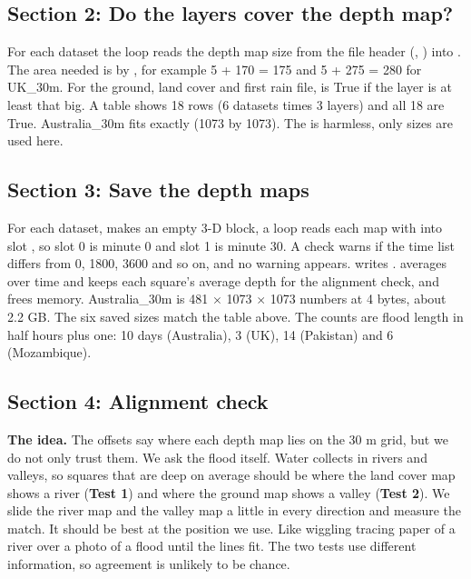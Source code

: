 
\subsection{Section 2: Do the layers cover the depth map?}

For each dataset the loop reads the depth map size from the file header (, ) into . The area needed is  by , for example 5 + 170 = 175 and 5 + 275 = 280 for UK\_30m. For the ground, land cover and first rain file,  is True if the layer is at least that big. A  table shows 18 rows (6 datasets times 3 layers) and all 18 are True. Australia\_30m fits exactly (1073 by 1073). The  is harmless, only sizes are used here.

\subsection{Section 3: Save the depth maps}

For each dataset,  makes an empty 3-D block, a loop reads each map with  into slot , so slot 0 is minute 0 and slot 1 is minute 30. A check warns if the time list differs from 0, 1800, 3600 and so on, and no warning appears.  writes .  averages over time and keeps each square's average depth for the alignment check, and  frees memory. Australia\_30m is 481 $\times$ 1073 $\times$ 1073 numbers at 4 bytes, about 2.2 GB. The six saved sizes match the table above. The counts are flood length in half hours plus one: 10 days (Australia), 3 (UK), 14 (Pakistan) and 6 (Mozambique).

\subsection{Section 4: Alignment check}

\begin{plainbox}
\textbf{The idea.} The offsets say where each depth map lies on the 30 m grid, but we do not only trust them. We ask the flood itself. Water collects in rivers and valleys, so squares that are deep on average should be where the land cover map shows a river (\textbf{Test 1}) and where the ground map shows a valley (\textbf{Test 2}). We slide the river map and the valley map a little in every direction and measure the match. It should be best at the position we use. Like wiggling tracing paper of a river over a photo of a flood until the lines fit. The two tests use different information, so agreement is unlikely to be chance.
\end{plainbox}

